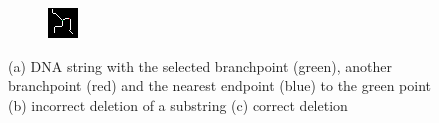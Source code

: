 \documentclass{article}
\begin{document}
\begin{figure}[H]
\begin{subfigure}[b]{0.32\textwidth}
		\caption{}
		\label{fig:remove2DenPhi}
	\end{subfigure}
	\begin{subfigure}[b]{0.32\textwidth}
		\includegraphics[width=\linewidth]{remove3}
		\caption{}
		\label{fig:remove3DenPhi}
	\end{subfigure}
	\captionsetup{justification=centering}
	\caption{(a) DNA string with the selected branchpoint (green), another branchpoint (red) and the nearest endpoint (blue) to the green point\\(b) incorrect deletion of a substring (c) correct deletion}
	\label{fig:removalsDenPhi} %
\end{figure}
\end{document}
